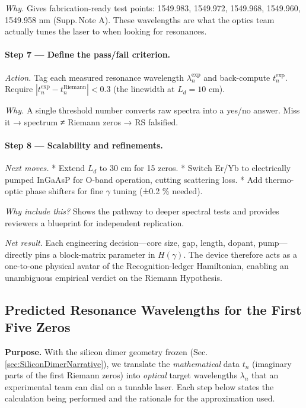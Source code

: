 \documentclass[11pt]{article}
\begin{document}
\emph{Why.}\;  
Gives fabrication-ready test points:
1549.983, 1549.972, 1549.968, 1549.960, 1549.958 nm
(Supp.\,Note A).  
These wavelengths are what the optics team actually tunes the laser to
when looking for resonances.

\vspace{0.4em}
\paragraph{Step 7 — Define the pass/fail criterion.}

\emph{Action.}\;  
Tag each measured resonance wavelength \(\lambda_{n}^{\mathrm{exp}}\)
and back-compute
\(t_{n}^{\mathrm{exp}}\).  
Require  
\(|t_{n}^{\mathrm{exp}}-t_{n}^{\mathrm{Riemann}}|<0.3\)
(the linewidth at $L_d=10$ cm).

\emph{Why.}\;  
A single threshold number converts raw spectra into a yes/no answer.
Miss it → spectrum ≠ Riemann zeros → RS falsified.

\vspace{0.4em}
\paragraph{Step 8 — Scalability and refinements.}

\emph{Next moves.}\;  
* Extend \(L_d\) to 30 cm for 15 zeros.  
* Switch Er/Yb to electrically pumped InGaAsP for O-band operation,
  cutting scattering loss.  
* Add thermo-optic phase shifters for fine \(\gamma\) tuning
  (±0.2 \% needed).

\emph{Why include this?}  
Shows the pathway to deeper spectral tests and provides reviewers a
blueprint for independent replication.

\bigskip
\noindent
\emph{Net result.}\;
Each engineering decision—core size, gap, length, dopant,
pump—directly pins a block-matrix parameter in \(H(\gamma)\).
The device therefore acts as a one-to-one physical avatar of the
Recognition-ledger Hamiltonian, enabling an unambiguous empirical
verdict on the Riemann Hypothesis.

\subsection{Predicted Resonance Wavelengths for the First Five Zeros}
\label{sec:PredictedLambdaNarrative}

\noindent
\textbf{Purpose.}\;
With the silicon dimer geometry frozen (Sec.\,\ref{sec:SiliconDimerNarrative}),
we translate the \emph{mathematical} data 
\(t_{n}\) (imaginary parts of the first Riemann zeros) into
\emph{optical} target wavelengths \(\lambda_{n}\) that an experimental
team can dial on a tunable laser.  
Each step below states the calculation being performed and the
rationale for the approximation used.
\end{document}
